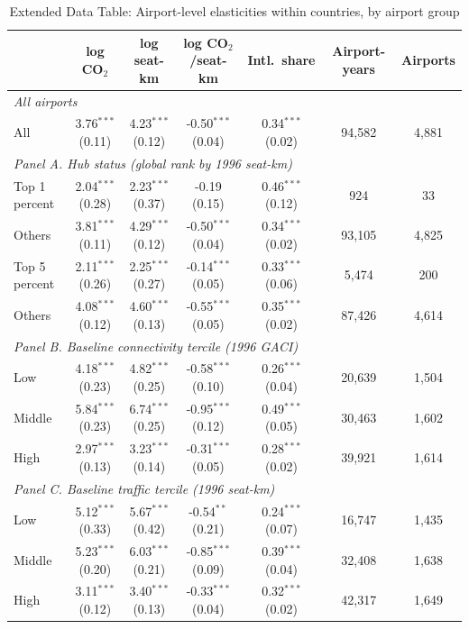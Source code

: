 \begin{table}[htbp]
\centering
\begin{threeparttable}
\caption{Extended Data Table: Airport-level elasticities within countries, by airport group}
\label{tab:airport_het}
\scriptsize
\begin{tabular}{lcccccc}
\toprule
 & log CO$_2$ & log seat-km & log CO$_2$/seat-km & Intl.\ share & Airport-years & Airports \\
\midrule
\multicolumn{7}{l}{\textit{All airports}} \\
  All & 3.76$^{***}$ (0.11) & 4.23$^{***}$ (0.12) & -0.50$^{***}$ (0.04) & 0.34$^{***}$ (0.02) & 94,582 & 4,881 \\
\multicolumn{7}{l}{\textit{Panel A. Hub status (global rank by 1996 seat-km)}} \\
  Top 1 percent & 2.04$^{***}$ (0.28) & 2.23$^{***}$ (0.37) & -0.19 (0.15) & 0.46$^{***}$ (0.12) & 924 & 33 \\
  Others & 3.81$^{***}$ (0.11) & 4.29$^{***}$ (0.12) & -0.50$^{***}$ (0.04) & 0.34$^{***}$ (0.02) & 93,105 & 4,825 \\
  Top 5 percent & 2.11$^{***}$ (0.26) & 2.25$^{***}$ (0.27) & -0.14$^{***}$ (0.05) & 0.33$^{***}$ (0.06) & 5,474 & 200 \\
  Others & 4.08$^{***}$ (0.12) & 4.60$^{***}$ (0.13) & -0.55$^{***}$ (0.05) & 0.35$^{***}$ (0.02) & 87,426 & 4,614 \\
\multicolumn{7}{l}{\textit{Panel B. Baseline connectivity tercile (1996 GACI)}} \\
  Low & 4.18$^{***}$ (0.23) & 4.82$^{***}$ (0.25) & -0.58$^{***}$ (0.10) & 0.26$^{***}$ (0.04) & 20,639 & 1,504 \\
  Middle & 5.84$^{***}$ (0.23) & 6.74$^{***}$ (0.25) & -0.95$^{***}$ (0.12) & 0.49$^{***}$ (0.05) & 30,463 & 1,602 \\
  High & 2.97$^{***}$ (0.13) & 3.23$^{***}$ (0.14) & -0.31$^{***}$ (0.05) & 0.28$^{***}$ (0.02) & 39,921 & 1,614 \\
\multicolumn{7}{l}{\textit{Panel C. Baseline traffic tercile (1996 seat-km)}} \\
  Low & 5.12$^{***}$ (0.33) & 5.67$^{***}$ (0.42) & -0.54$^{**}$ (0.21) & 0.24$^{***}$ (0.07) & 16,747 & 1,435 \\
  Middle & 5.23$^{***}$ (0.20) & 6.03$^{***}$ (0.21) & -0.85$^{***}$ (0.09) & 0.39$^{***}$ (0.04) & 32,408 & 1,638 \\
  High & 3.11$^{***}$ (0.12) & 3.40$^{***}$ (0.13) & -0.33$^{***}$ (0.04) & 0.32$^{***}$ (0.02) & 42,317 & 1,649 \\

\end{tabular}
\end{threeparttable}
\end{table}
